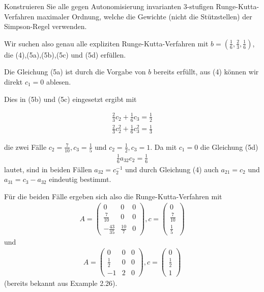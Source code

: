 \begin{exercise}

Konstruieren Sie alle gegen Autonomisierung invarianten $3$-stufigen Runge-Kutta-Verfahren maximaler Ordnung, welche die Gewichte (nicht die Stützstellen) der Simpson-Regel verwenden.

\end{exercise}

\begin{solution}

Wir suchen also genau alle expliziten Runge-Kutta-Verfahren mit $b = (\frac{1}{6},\frac{2}{3},\frac{1}{6})$, die (4),(5a),(5b),(5c) und (5d) erfüllen.

Die Gleichung (5a) ist durch die Vorgabe von $b$ bereits erfüllt, aus (4) können wir direkt $c_{1}=0$ ablesen.

Dies in (5b) und (5c) eingesetzt ergibt mit

\begin{align*}
    \frac{2}{3}c_{2} + \frac{1}{6}c_{3} = \frac{1}{2} \\
    \frac{2}{3}c_{2}^{2} + \frac{1}{6}c_{3}^{2} = \frac{1}{3}
\end{align*}

die zwei Fälle $c_{2}=\frac{7}{10}, c_{3}=\frac{1}{5}$ und $c_{2}=\frac{1}{2}, c_{3}=1$.
Da mit $c_{1}=0$ die Gleichung (5d)
\begin{align*}
    \frac{1}{6}a_{32}c_{2}=\frac{1}{6}
\end{align*}
lautet, sind in beiden Fällen $a_{32}=c_{2}^{-1}$ und durch Gleichung (4) auch $a_{21}=c_{2}$ und $a_{31}=c_{3}-a_{32}$ eindeutig bestimmt.

Für die beiden Fälle ergeben sich also die Runge-Kutta-Verfahren mit
\begin{align*}
    A = \left( \begin{array}{rrr}
         0 & 0 & 0 \\
        \frac{7}{10} & 0 & 0 \\
        -\frac{43}{35} & \frac{10}{7} & 0
    \end{array} \right) , c = \begin{pmatrix}
    0 \\ \frac{7}{10} \\ \frac{1}{5}
    \end{pmatrix}
\end{align*}
und
\begin{align*}
    A = \left( \begin{array}{rrr}
         0 & 0 & 0 \\
        \frac{1}{2} & 0 & 0 \\
        -1 & 2 & 0
    \end{array} \right) , c = \begin{pmatrix}
    0 \\ \frac{1}{2} \\ 1
    \end{pmatrix}
\end{align*}
(bereits bekannt aus Example 2.26).
\end{solution}
